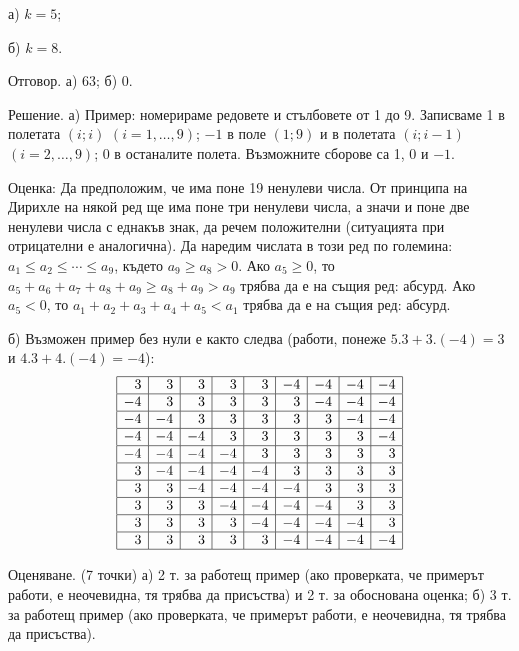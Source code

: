 а) $k=5$;

б) $k=8$.

Отговор. а) 63; б) 0.

Решение. а) Пример: номерираме редовете и стълбовете от 1 до 9. Записваме 1 в полетата $(i;i)$ $(i=1,\ldots,9)$; $-1$ в поле $(1;9)$ и в полетата $(i;i-1)$ $(i=2,\ldots,9)$; 0 в останалите полета. Възможните сборове са 1, 0 и $-1$.

Оценка: Да предположим, че има поне 19 ненулеви числа. От принципа на Дирихле на някой ред ще има поне три ненулеви числа, а значи и поне две ненулеви числа с еднакъв знак, да речем положителни (ситуацията при отрицателни е аналогична). Да наредим числата в този ред по големина: $a_1\le a_2\le\cdots\le a_9$, където $a_9\ge a_8>0$. Ако $a_5\ge0$, то $a_5+a_6+a_7+a_8+a_9\ge a_8+a_9>a_9$ трябва да е на същия ред: абсурд. Ако $a_5<0$, то $a_1+a_2+a_3+a_4+a_5<a_1$ трябва да е на същия ред: абсурд.

б) Възможен пример без нули е както следва (работи, понеже $5.3+3.(-4)=3$ и $4.3+4.(-4)=-4$):
$$
\begin{array}{|r|r|r|r|r|r|r|r|r|}
\hline
3&3&3&3&3&-4&-4&-4&-4\\
\hline
-4&3&3&3&3&3&-4&-4&-4\\
\hline
-4&-4&3&3&3&3&3&-4&-4\\
\hline
-4&-4&-4&3&3&3&3&3&-4\\
\hline
-4&-4&-4&-4&3&3&3&3&3\\
\hline
3&-4&-4&-4&-4&3&3&3&3\\
\hline
3&3&-4&-4&-4&-4&3&3&3\\
\hline
3&3&3&-4&-4&-4&-4&3&3\\
\hline
3&3&3&3&-4&-4&-4&-4&3\\
\hline
3&3&3&3&3&-4&-4&-4&-4\\
\hline
\end{array}
$$

Оценяване. (7 точки) а) 2 т. за работещ пример (ако проверката, че примерът работи, е неочевидна, тя трябва да присъства) и 2 т. за обоснована оценка; б) 3 т. за работещ пример (ако проверката, че примерът работи, е неочевидна, тя трябва да присъства).

